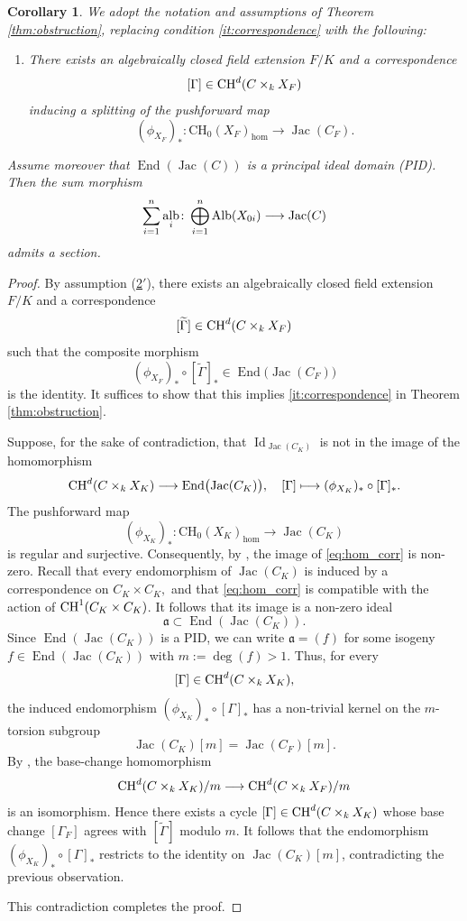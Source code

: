 \documentclass[11pt,letterpaper]{amsart}
\newcommand{\Alb}{\textnormal{Alb}}
\newcommand{\CH}{\textnormal{CH}}
\numberwithin{equation}{section}
\newtheorem{corollary}[theorem]{Corollary}
\theoremstyle{definition}
\theoremstyle{remark}
\DeclareMathOperator{\al}{alb}
\newcommand{\Ch}{\operatorname{CH_{0}}}
\DeclareMathOperator{\End}{End}
\DeclareMathOperator{\Id}{Id}
\DeclareMathOperator{\jac}{Jac}
\begin{document}
\begin{corollary}\label{cor:obstruction}
We adopt the notation and assumptions of Theorem \ref{thm:obstruction}, replacing condition \eqref{it:correspondence} with the following:
\begin{enumerate}
    \item[\((2')\)]\label{it:correspondence-prime} There exists an algebraically closed field extension $F/K$ and a correspondence
$$
[\Gamma] \in \CH^{d}(C \times_k X_{F})
$$
inducing a splitting of the pushforward map
$$
(\phi_{X_F})_\ast\colon \Ch(X_{F})_{\hom}\longrightarrow\jac(C_{F}).
$$
\end{enumerate}
Assume moreover that $\End(\jac(C))$ is a principal ideal domain (PID). Then the sum morphism $$\sum_{i=1}^{n}\al_{i}\colon\bigoplus_{i=1}^{n}\Alb(X_{0i})\longrightarrow\jac(C)$$
admits a section. 
\end{corollary}
\begin{proof}
By assumption (\hyperref[it:correspondence-prime]{2$'$}), there exists an algebraically closed field extension $F/K$ and a correspondence $$[\widetilde{\Gamma}] \in \CH^{d}(C \times_k X_{F})$$ such that the composite morphism $$(\phi_{X_F})_\ast\circ[\widetilde{\Gamma}]_{\ast}\in\End\bigl(\jac(C_{F})\bigr)$$ is the identity. It suffices to show that this implies \eqref{it:correspondence} in Theorem \ref{thm:obstruction}.\par
Suppose, for the sake of contradiction, that $\Id_{\jac(C_{K})}$ is not in the image of the homomorphism 
\begin{equation}\label{eq:hom_corr}\CH^{d}(C \times_k X_{K})\longrightarrow\End\bigl(\jac(C_{K})\bigr),\quad [\Gamma]\longmapsto (\phi_{X_{K}})_{\ast}\circ[\Gamma]_{\ast}.\end{equation} 
The pushforward map $$(\phi_{X_{K}})_{\ast}\colon \Ch(X_{K})_{\hom}\longrightarrow\jac(C_{K})$$ is regular and surjective. Consequently, by \cite[Corollary 1.6.3]{Murre}, the image of \eqref{eq:hom_corr} is non-zero. Recall that every endomorphism of $\jac(C_K)$ is induced by a correspondence on $C_{K}\times C_{K},$ and that \eqref{eq:hom_corr} is compatible with the action of $\CH^{1}(C_{K}\times C_{K})$. It follows that its image is a non-zero ideal $$\mathfrak{a}\subset\End(\jac(C_K)).$$ Since $\End(\jac(C_K))$ is a PID, we can write $\mathfrak{a}=(f)$ for some isogeny $f\in\End(\jac(C_K))$ with $m:=\deg(f)>1$. Thus, for every $$ [\Gamma]\in\CH^{d}(C \times_k X_{K}),$$ the induced endomorphism $(\phi_{X_K})_\ast\circ[\Gamma]_{\ast}$ has a non-trivial kernel on the $m$-torsion subgroup $$\jac(C_{K})[m]=\jac(C_{F})[m].$$ By \cite[Théorème 3.11]{lecomte}, the base-change homomorphism $$\CH^{d}(C \times_k X_{K})/m\longrightarrow \CH^{d}(C \times_k X_{F})/m$$ is an isomorphism. Hence there exists a cycle $[\Gamma]\in\CH^{d}(C \times_k X_{K})$ whose base change $[\Gamma_{F}]$ agrees with $[\widetilde{\Gamma}]$ modulo $m$. It follows that the endomorphism $(\phi_{X_K})_\ast\circ[\Gamma]_{\ast}$ restricts to the identity on $\jac(C_{K})[m]$, contradicting the previous observation.\par
This contradiction completes the proof.
\end{proof}
\end{document}
